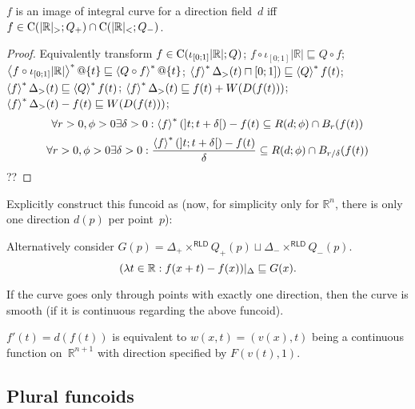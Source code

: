 \begin{thm}
$f$ is an image of integral curve for a direction field~$d$ iff
$f\in\mathrm{C}(|\mathbb{R}|_{>};Q_+)\cap\mathrm{C}(|\mathbb{R}|_{<};Q_-)$.
\end{thm}

\begin{proof}
Equivalently transform $f\in\mathrm{C}(\iota_{[0;1]}|\mathbb{R}|;Q)$; $f\circ \iota_{[0;1]}|\mathbb{R}|\sqsubseteq Q\circ f$;
$\left\langle f\circ \iota_{[0;1]}|\mathbb{R}|\right\rangle ^{\ast}@\{t\}\sqsubseteq \left\langle Q\circ f\right\rangle ^{\ast}@\{t\}$;
$\left\langle f\right\rangle ^{\ast}\Delta_{>}(t)\sqcap[0;1])\sqsubseteq \left\langle Q\right\rangle ^{\ast}f(t)$;
$\left\langle f\right\rangle ^{\ast}\Delta_{>}(t)\sqsubseteq \left\langle Q\right\rangle ^{\ast}f(t)$;
$\left\langle f\right\rangle ^{\ast}\Delta_{>}(t)\sqsubseteq f(t)+W(D(f(t)))$;
$\left\langle f\right\rangle ^{\ast}\Delta_{>}(t)-f(t)\sqsubseteq W(D(f(t)))$;
\[ \forall r>0, \phi>0 \exists\delta>0: \left\langle f\right\rangle ^{\ast}(]t;t+\delta[)-f(t)\subseteq R(d;\phi) \cap B_r(f(t)) \]
\[ \forall r>0, \phi>0 \exists\delta>0: \frac{\left\langle f\right\rangle ^{\ast}(]t;t+\delta[)-f(t)}{\delta}\subseteq R(d;\phi) \cap B_{r/\delta}(f(t)) \]
??
\end{proof}


Explicitly construct this funcoid as (now, for simplicity only for $\mathbb{R}^n$, there is only one direction $d(p)$ per point~$p$):

Alternatively consider $G(p) = \Delta_+\times^{\mathsf{RLD}}Q_+(p) \sqcup \Delta_-\times^{\mathsf{RLD}}Q_-(p)$.
\[ (\lambda t\in\mathbb{R}:f(x+t)-f(x))|_{\Delta} \sqsubseteq G(x). \]

\begin{conjecture}
If the curve goes only through points with exactly one direction, then the curve is smooth (if it is continuous regarding the above funcoid).
\end{conjecture}


$f'(t)=d(f(t))$ is equivalent to $w(x,t)=(v(x),t)$ being a continuous function on~$\mathbb{R}^{n+1}$ with direction specified by
$F(v(t), 1)$.

\subsection{Plural funcoids}

